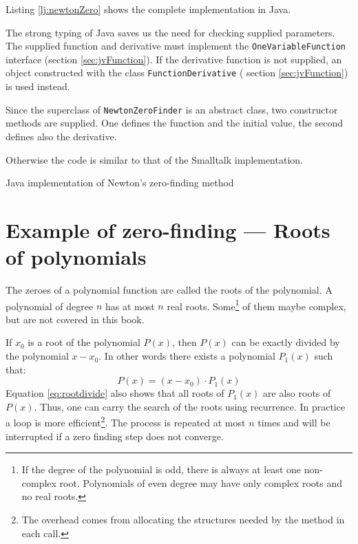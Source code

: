\documentclass[twoside]{book}
\begin{document}
Listing \ref{lj:newtonZero} shows the complete implementation in
Java.

The strong typing of Java saves us the need for checking supplied
parameters. The supplied function and derivative must implement
the {\tt OneVariableFunction} interface (\cf section
\ref{sec:jvFunction}). If the derivative function is not supplied,
an object constructed with the class {\tt FunctionDerivative} (\cf
section \ref{sec:jvFunction}) is used instead.

Since the superclass of {\tt NewtonZeroFinder} is an abstract
class, two constructor methods are supplied. One defines the
function and the initial value, the second defines also the
derivative.

Otherwise the code is similar to that of the Smalltalk
implementation.
\begin{listing} Java implementation of Newton's zero-finding method \label{lj:newtonZero}

\end{listing}


\section{Example of zero-finding --- Roots of polynomials}
\label{sec:polroots} The zeroes of a polynomial function are
called the roots of the polynomial. A polynomial of degree $n$ has
at most $n$ real roots. Some\footnote{If the degree of the
polynomial is odd, there is always at least one non-complex root.
Polynomials of even degree may have only complex roots and no real
roots.} of them maybe complex, but are not covered in this book.

If $x_0$ is a root of the polynomial $P\left(x\right)$, then
$P\left(x\right)$ can be exactly divided by the polynomial
$x-x_0$. In other words there exists a polynomial
$P_1\left(x\right)$ such that:
\begin{equation}
\label{eq:rootdivide}
  P\left(x\right) = \left(x-x_0\right)\cdot P_1\left(x\right)
\end{equation}
Equation \ref{eq:rootdivide} also shows that all roots of
$P_1\left(x\right)$ are also roots of $P\left(x\right)$. Thus, one
can carry the search of the roots using recurrence. In practice a
loop is more efficient\footnote{The overhead comes from allocating
the structures needed by the method in each call.}. The process is
repeated at most $n$ times and will be interrupted if a zero
finding step does not converge.
\end{document}
